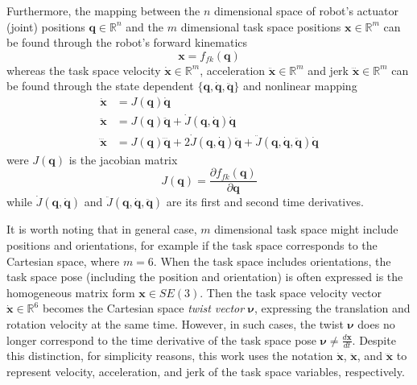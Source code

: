 Furthermore, the mapping between the $n$ dimensional space of robot's actuator (joint) positions $\bm{q}\in \mathbb{R}^n$ and the $m$ dimensional task space positions $\bm{x} \in \mathbb{R}^m$ can be found through the robot's forward kinematics 
\begin{equation}
    \bm{x} = f_{fk} (\bm{q})
\end{equation}
whereas the task space velocity $\dot{\bm{x}}\in \mathbb{R}^m$, acceleration $\ddot{\bm{x}}\in \mathbb{R}^m$ and jerk $\dddot{\bm{x}}\in \mathbb{R}^m$ can be found through the state dependent  $\{\bm{q},\dot{\bm{q}},\ddot{\bm{q}}\}$  and nonlinear mapping
\begin{subequations}
\begin{align}
\dot{\bm{x}}&= {J}(\bm{q})\dot{\bm{q}} \label{eq:js_to_cs_vaj:vel}\\
\ddot{\bm{x}}&= J(\bm{q})\ddot{\bm{q}} + \dot{J}(\bm{q},\dot{\bm{q}})\dot{\bm{q}} \label{eq:js_to_cs_vaj:accel}\\
\dddot{\bm{x}}&= J(\bm{q})\dddot{\bm{q}} + 2\dot{J}(\bm{q},\dot{\bm{q}})\ddot{\bm{q}} + \ddot{J}(\bm{q},\dot{\bm{q}},\ddot{\bm{q}})\dot{\bm{q}}\label{eq:js_to_cs_vaj:jerk}
 \end{align} \label{eq:js_to_cs_vaj}
\end{subequations}
were $J(\bm{q}) $ is the jacobian matrix
\begin{equation}
    J(\bm{q}) = \frac{\partial f_{fk} (\bm{q})}{\partial \bm{q}}
\end{equation}
while $\dot{J}(\bm{q},\dot{\bm{q}})$ and $\ddot{J}(\bm{q},\dot{\bm{q}},\ddot{\bm{q}})$ are its first and second time derivatives.


It is worth noting that in general case, $m$ dimensional task space might include positions and orientations, for example if the task space corresponds to the Cartesian space, where $m=6$. When the task space includes orientations, the task space pose (including the position and orientation) is often expressed is the homogeneous matrix form $\bm{x}\in SE(3)$. Then the task space velocity vector $\dot{\bm{x}}\in\mathbb{R}^6$ becomes the Cartesian space \textit{twist vector} $\bm{\nu}$, expressing the translation and rotation velocity at the same time. However, in such cases, the twist $\bm{\nu}$ does no longer correspond to the time derivative of the task space pose $\bm{\nu}\neq\frac{d\bm{x}}{dt}$. Despite this distinction, for simplicity reasons, this work uses the notation $\dot{\bm{x}}$, $\ddot{\bm{x}}$, and $\dddot{\bm{x}}$ to represent velocity, acceleration, and jerk of the task space variables, respectively.

